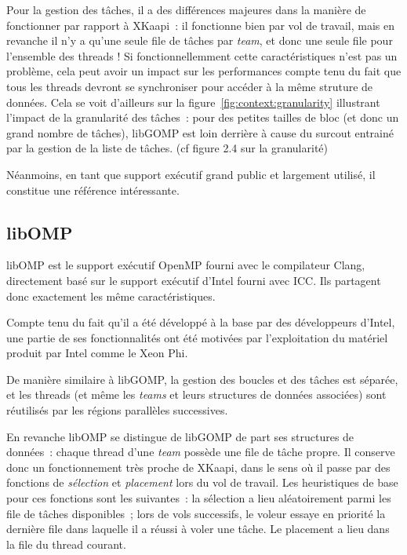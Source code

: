 Pour la gestion des tâches, il a des différences majeures dans la manière de fonctionner par rapport à XKaapi~: il fonctionne bien par vol de travail, mais en revanche il n'y a qu'une seule file de tâches par \emph{team}, et donc une seule file pour l'ensemble des threads !
Si fonctionnellemment cette caractéristiques n'est pas un problème, cela peut avoir un impact sur les performances compte tenu du fait que tous les threads devront se synchroniser pour accéder à la même struture de données.
Cela se voit d'ailleurs sur la figure~\ref{fig:context:granularity} illustrant l'impact de la granularité des tâches~: pour des petites tailles de bloc (et donc un grand nombre de tâches), libGOMP est loin derrière à cause du surcout entrainé par la gestion de la liste de tâches.
(cf figure 2.4 sur la granularité)

Néanmoins, en tant que support exécutif grand public et largement utilisé, il constitue une référence intéressante.

\subsection{libOMP}

libOMP est le support exécutif OpenMP fourni avec le compilateur Clang, directement basé sur le support exécutif d'Intel fourni avec ICC.
Ils partagent donc exactement les même caractéristiques.

Compte tenu du fait qu'il a été développé à la base par des développeurs d'Intel, une partie de ses fonctionnalités ont été motivées par l'exploitation du matériel produit par Intel comme le Xeon Phi.

De manière similaire à libGOMP, la gestion des boucles et des tâches est séparée, et les threads (et même les \emph{teams} et leurs structures de données associées) sont réutilisés par les régions parallèles successives.

En revanche libOMP se distingue de libGOMP de part ses structures de données~: chaque thread d'une \emph{team} possède une file de tâche propre.
Il conserve donc un fonctionnement très proche de XKaapi, dans le sens où il passe par des fonctions de \emph{sélection} et \emph{placement} lors du vol de travail.
Les heuristiques de base pour ces fonctions sont les suivantes~: la sélection a lieu aléatoirement parmi les file de tâches disponibles~; lors de vols successifs, le voleur essaye en priorité la dernière file dans laquelle il a réussi à voler une tâche. Le placement a lieu dans la file du thread courant.

